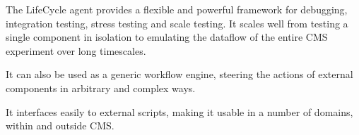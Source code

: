The LifeCycle agent provides a flexible and powerful framework for debugging, integration testing, stress testing and scale testing. It scales well from testing a single component in isolation to emulating the dataflow of the entire CMS experiment over long timescales.

It can also be used as a generic workflow engine, steering the actions of external components in arbitrary and complex ways.

It interfaces easily to external scripts, making it usable in a number of domains, within and outside CMS.